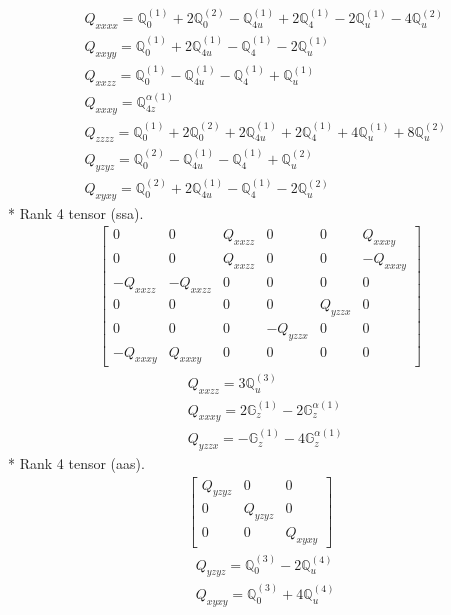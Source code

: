 \documentclass[fleqn,8pt,landscape]{jsarticle}
\begin{document}
\begin{align*}
& Q_{xxxx} = \mathbb{Q}_{0}^{(1)} + 2 \mathbb{Q}_{0}^{(2)} - \mathbb{Q}_{4u}^{(1)} + 2 \mathbb{Q}_{4}^{(1)} - 2 \mathbb{Q}_{u}^{(1)} - 4 \mathbb{Q}_{u}^{(2)} \\
& Q_{xxyy} = \mathbb{Q}_{0}^{(1)} + 2 \mathbb{Q}_{4u}^{(1)} - \mathbb{Q}_{4}^{(1)} - 2 \mathbb{Q}_{u}^{(1)} \\
& Q_{xxzz} = \mathbb{Q}_{0}^{(1)} - \mathbb{Q}_{4u}^{(1)} - \mathbb{Q}_{4}^{(1)} + \mathbb{Q}_{u}^{(1)} \\
& Q_{xxxy} = \mathbb{Q}_{4z}^{\alpha(1)} \\
& Q_{zzzz} = \mathbb{Q}_{0}^{(1)} + 2 \mathbb{Q}_{0}^{(2)} + 2 \mathbb{Q}_{4u}^{(1)} + 2 \mathbb{Q}_{4}^{(1)} + 4 \mathbb{Q}_{u}^{(1)} + 8 \mathbb{Q}_{u}^{(2)} \\
& Q_{yzyz} = \mathbb{Q}_{0}^{(2)} - \mathbb{Q}_{4u}^{(1)} - \mathbb{Q}_{4}^{(1)} + \mathbb{Q}_{u}^{(2)} \\
& Q_{xyxy} = \mathbb{Q}_{0}^{(2)} + 2 \mathbb{Q}_{4u}^{(1)} - \mathbb{Q}_{4}^{(1)} - 2 \mathbb{Q}_{u}^{(2)}
\end{align*}
* Rank 4 tensor (ssa).
\begin{align*}
\begin{bmatrix} 0 & 0 & Q_{xxzz} & 0 & 0 & Q_{xxxy} \\ 0 & 0 & Q_{xxzz} & 0 & 0 & - Q_{xxxy} \\ - Q_{xxzz} & - Q_{xxzz} & 0 & 0 & 0 & 0 \\ 0 & 0 & 0 & 0 & Q_{yzzx} & 0 \\ 0 & 0 & 0 & - Q_{yzzx} & 0 & 0 \\ - Q_{xxxy} & Q_{xxxy} & 0 & 0 & 0 & 0 \end{bmatrix}
\end{align*}
\begin{align*}
& Q_{xxzz} = 3 \mathbb{Q}_{u}^{(3)} \\
& Q_{xxxy} = 2 \mathbb{G}_{z}^{(1)} - 2 \mathbb{G}_{z}^{\alpha(1)} \\
& Q_{yzzx} = - \mathbb{G}_{z}^{(1)} - 4 \mathbb{G}_{z}^{\alpha(1)}
\end{align*}
* Rank 4 tensor (aas).
\begin{align*}
\begin{bmatrix} Q_{yzyz} & 0 & 0 \\ 0 & Q_{yzyz} & 0 \\ 0 & 0 & Q_{xyxy} \end{bmatrix}
\end{align*}
\begin{align*}
& Q_{yzyz} = \mathbb{Q}_{0}^{(3)} - 2 \mathbb{Q}_{u}^{(4)} \\
& Q_{xyxy} = \mathbb{Q}_{0}^{(3)} + 4 \mathbb{Q}_{u}^{(4)}
\end{align*}
\end{document}
